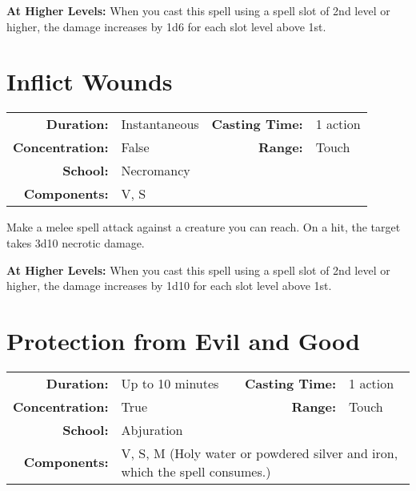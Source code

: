 \documentclass[a5paper, 12pt]{memoir}
\begin{document}
\vspace{8pt} \noindent\textbf{At Higher Levels:} When you cast this spell using a spell slot of 2nd level or higher, the damage increases by 1d6 for each slot level above 1st.
\newpage
\section*{Inflict Wounds}

{
\small\centering\vspace{-6pt}
\begin{tabular}{rlrl}
\toprule

\textbf{Duration:} & Instantaneous &
\textbf{Casting Time:} & 1 action \\
\textbf{Concentration:} & False &
\textbf{Range:} & Touch \\
\textbf{School:} & Necromancy \\
\textbf{Components:} & \multicolumn{3}{p{0.7\textwidth}}{V, S}\\

\bottomrule
\end{tabular}
}

\vspace{1\baselineskip}\noindent Make a melee spell attack against a creature you can reach. On a hit, the target takes 3d10 necrotic damage.

\vspace{8pt} \noindent\textbf{At Higher Levels:} When you cast this spell using a spell slot of 2nd level or higher, the damage increases by 1d10 for each slot level above 1st.
\newpage
\section*{Protection from Evil and Good}

{
\small\centering\vspace{-6pt}
\begin{tabular}{rlrl}
\toprule

\textbf{Duration:} & Up to 10 minutes &
\textbf{Casting Time:} & 1 action \\
\textbf{Concentration:} & True &
\textbf{Range:} & Touch \\
\textbf{School:} & Abjuration \\
\textbf{Components:} & \multicolumn{3}{p{0.7\textwidth}}{V, S, M (Holy water or powdered silver and iron, which the spell consumes.)}\\

\bottomrule
\end{tabular}
}
\end{document}
